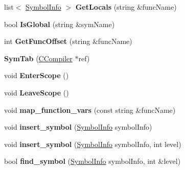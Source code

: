 \begin{DoxyCompactItemize}
\item 
\hypertarget{classSymTab_a76b5a70170535019b1fe58fa25a9998c}{list$<$ \hyperlink{structSymbolInfo}{Symbol\-Info} $>$ {\bfseries Get\-Locals} (string \&func\-Name)}\label{classSymTab_a76b5a70170535019b1fe58fa25a9998c}

\item 
\hypertarget{classSymTab_a4c4699d90ffd605b205e9e94be9eacde}{bool {\bfseries Is\-Global} (string \&sym\-Name)}\label{classSymTab_a4c4699d90ffd605b205e9e94be9eacde}

\item 
\hypertarget{classSymTab_a793c31d247f484b04a9283e71f172756}{int {\bfseries Get\-Func\-Offset} (string \&func\-Name)}\label{classSymTab_a793c31d247f484b04a9283e71f172756}

\item 
\hypertarget{classSymTab_a20c7b65c7ffb728fa792e87258d381a2}{{\bfseries Sym\-Tab} (\hyperlink{classCCompiler}{C\-Compiler} $\ast$ref)}\label{classSymTab_a20c7b65c7ffb728fa792e87258d381a2}

\item 
\hypertarget{classSymTab_af335dd1ba840dfab4219856545d5d8ef}{void {\bfseries Enter\-Scope} ()}\label{classSymTab_af335dd1ba840dfab4219856545d5d8ef}

\item 
\hypertarget{classSymTab_afd2c44208cdad3ddfc85136136cd27c3}{void {\bfseries Leave\-Scope} ()}\label{classSymTab_afd2c44208cdad3ddfc85136136cd27c3}

\item 
\hypertarget{classSymTab_aaca51de0935bbdbf3fdf434deccccb92}{void {\bfseries map\-\_\-function\-\_\-vars} (const string \&func\-Name)}\label{classSymTab_aaca51de0935bbdbf3fdf434deccccb92}

\item 
\hypertarget{classSymTab_ad8e59e29c50f039570c5844871bf838c}{void {\bfseries insert\-\_\-symbol} (\hyperlink{structSymbolInfo}{Symbol\-Info} symbol\-Info)}\label{classSymTab_ad8e59e29c50f039570c5844871bf838c}

\item 
\hypertarget{classSymTab_a8372047f573c6d84fa231aa7e9842280}{void {\bfseries insert\-\_\-symbol} (\hyperlink{structSymbolInfo}{Symbol\-Info} symbol\-Info, int level)}\label{classSymTab_a8372047f573c6d84fa231aa7e9842280}

\item 
\hypertarget{classSymTab_a2aedd91e00780c889e60a60fc0795daf}{bool {\bfseries find\-\_\-symbol} (\hyperlink{structSymbolInfo}{Symbol\-Info} symbol\-Info, int \&level)}\label{classSymTab_a2aedd91e00780c889e60a60fc0795daf}


\end{DoxyCompactItemize}
